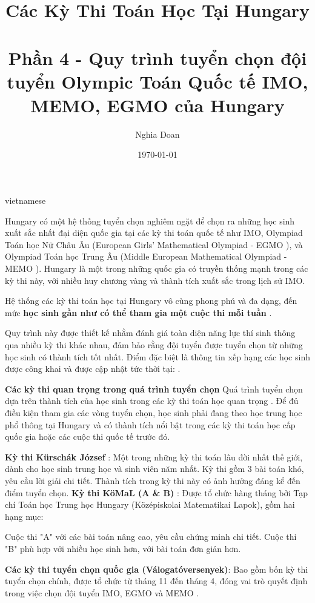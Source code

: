 \documentclass{article}
\title{Các Kỳ Thi Toán Học Tại Hungary\\ \quad \\Phần 4 - Quy trình tuyển chọn đội tuyển Olympic Toán Quốc tế IMO, MEMO, EGMO của Hungary}
\author{Nghia Doan}
\date{\today}
\begin{document}
\begin{otherlanguage*}{vietnamese}

\maketitle

Hungary có một hệ thống tuyển chọn nghiêm ngặt để chọn ra những học sinh xuất sắc nhất đại diện quốc gia tại các kỳ thi toán quốc tế như IMO,
Olympiad Toán học Nữ Châu Âu (European Girls' Mathematical Olympiad - EGMO \cite{EGMO}),
và Olympiad Toán học Trung Âu (Middle European Mathematical Olympiad - MEMO \cite{MEMO}).
Hungary là một trong những quốc gia có truyền thống mạnh trong các kỳ thi này, với nhiều huy chương vàng và thành tích xuất sắc trong lịch sử IMO.

Hệ thống các kỳ thi toán học tại Hungary vô cùng phong phú và đa dạng, đến mức \textbf{học sinh gần như có thể tham gia một cuộc thi mỗi tuần} \cite{naptar_minden}.

Quy trình này được thiết kế nhằm đánh giá toàn diện năng lực thí sinh thông qua nhiều kỳ thi khác nhau, đảm bảo rằng đội tuyển được tuyển chọn từ những học sinh có thành tích tốt nhất.
Điểm đặc biệt là thông tin xếp hạng các học sinh được công khai và được cập nhật tức thời tại: \cite{allas}.

\textbf{Các kỳ thi quan trọng trong quá trình tuyển chọn}
Quá trình tuyển chọn dựa trên thành tích của học sinh trong các kỳ thi toán học quan trọng \cite{szabalyok}. Để đủ điều kiện tham gia các vòng tuyển chọn,
học sinh phải đang theo học trung học phổ thông tại Hungary và có thành tích nổi bật trong các kỳ thi toán học cấp quốc gia hoặc các cuộc thi quốc tế trước đó.

\begin{itemize}[topsep=0pt, partopsep=0pt, itemsep=0pt]
    \ii \textbf{Kỳ thi Kürschák József} \cite{Kurschak}: Một trong những kỳ thi toán lâu đời nhất thế giới, dành cho học sinh trung học và sinh viên năm nhất.
    Kỳ thi gồm 3 bài toán khó, yêu cầu lời giải chi tiết. Thành tích trong kỳ thi này có ảnh hưởng đáng kể đến điểm tuyển chọn.
    \ii \textbf{Kỳ thi KöMaL (A \& B)} \cite{KoMaL}: Được tổ chức hàng tháng bởi Tạp chí Toán học Trung học Hungary (Középiskolai Matematikai Lapok), gồm hai hạng mục:
    \begin{itemize}
        \ii Cuộc thi "A" với các bài toán nâng cao, yêu cầu chứng minh chi tiết.
        \ii Cuộc thi "B" phù hợp với nhiều học sinh hơn, với bài toán đơn giản hơn.
    \end{itemize}
    \ii \textbf{Các kỳ thi tuyển chọn quốc gia (Válogatóversenyek)}: Bao gồm bốn kỳ thi tuyển chọn chính, được tổ chức từ tháng 11 đến tháng 4,
    đóng vai trò quyết định trong việc chọn đội tuyển IMO, EGMO và MEMO \cite{naptar_csapat}.
\end{itemize}


\end{otherlanguage*}
\end{document}
